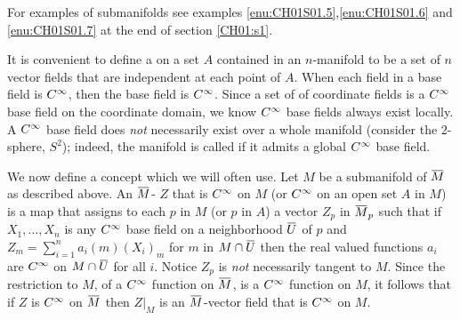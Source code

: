 \documentclass[../main]{subfiles}
\begin{document}
For examples of submanifolds see examples \ref{enu:CH01S01.5},\ref{enu:CH01S01.6} and \ref{enu:CH01S01.7} at the end of section \ref{CH01:s1}.

It is convenient to define a  on a set $A$ contained in an $n$-manifold to be a set of $n$ vector fields that are independent at each point of $A$. When each field in a base field is $C^\infty$, then the base field is $C^\infty$. Since a set of of coordinate fields is a $C^\infty$ base field on the coordinate domain, we know $C^\infty$ base fields always exist locally. A $C^\infty$ base field does \emph{not} necessarily exist over a whole manifold (consider the $2$-sphere, $S^2$); indeed, the manifold is called  if it admits a global $C^\infty$ base field.

We now define a concept which we will often use. Let $M$ be a submanifold of $\xoverline{M}$ as described above. An $\xoverline{M}$- $Z$ that is $C^\infty$ on $M$ (or $C^\infty$ on an open set $A$ in $M$) is a map that assigns to each $p$ in $M$ (or $p$ in $A$) a vector $Z_p$ in $\xoverline{M}_p$ such that if $X_1, \dots, X_n$ is any $C^\infty$ base field on a neighborhood $\xoverline{U}$ of $p$ and $Z_m = \sum_{i=1} ^n a_i (m)(X_i)_m$ for $m$ in $M \cap \xoverline{U}$ then the real valued functions $a_i$ are $C^\infty$ on $M \cap \xoverline{U}$ for all $i$. Notice $Z_p$ is \emph{not} necessarily tangent to $M$. Since the restriction to $M$, of a $C^\infty$ function on $\xoverline{M}$, is a $C^\infty$ function on $M$, it follows that if $Z$ is $C^\infty$ on $\xoverline{M}$ then $Z|_M$ is an $\xoverline{M}$-vector field that is $C^\infty$ on $M$.
\end{document}

